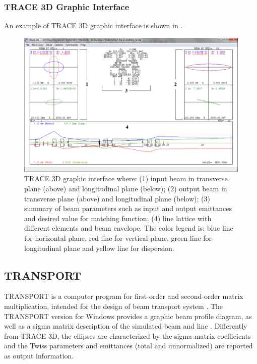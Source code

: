 \subsubsection{TRACE 3D Graphic Interface}
\label{ssec:T3D_graphic}
An example of TRACE 3D graphic interface is shown in .
\begin{figure}[htbp]
\centering
  \includegraphics[width=\textwidth-1cm, keepaspectratio=true]{figures/Benchmarks/Trace.png}
    \caption{TRACE 3D graphic interface where: (1) input beam in transverse plane (above) and longitudinal plane (below); (2) output beam in transverse plane (above) and longitudinal plane (below); (3) summary of beam parameters such as input and output emittances and desired value for matching function; (4) line lattice with different elements and beam envelope. The color legend is: blue line for horizontal plane, red line for vertical plane, green line for longitudinal plane and yellow line for dispersion.}
    \label{fig:trace}
\end{figure}
\clearpage
\subsection{TRANSPORT}
\label{sec:TRAN}
TRANSPORT is a computer program for first-order and second-order matrix multiplication, intended for the design of beam transport system \cite{bib:transport}. The TRANSPORT version for Windows provides a graphic beam profile diagram, as well as a sigma matrix description of the simulated beam and line \cite{Transport_GUI}.
Differently from TRACE 3D, the ellipses are characterized by the sigma-matrix coefficients and the Twiss parameters and emittances (total and unnormalized) are reported as output information.
